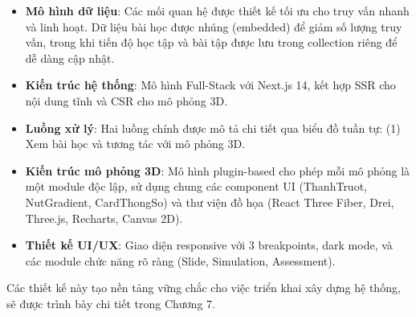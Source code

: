 \begin{itemize}
    \item \textbf{Mô hình dữ liệu}: Các mối quan hệ được thiết kế tối ưu cho truy vấn nhanh và linh hoạt. Dữ liệu bài học được nhúng (embedded) để giảm số lượng truy vấn, trong khi tiến độ học tập và bài tập được lưu trong collection riêng để dễ dàng cập nhật.
    
    \item \textbf{Kiến trúc hệ thống}: Mô hình Full-Stack với Next.js 14, kết hợp SSR cho nội dung tĩnh và CSR cho mô phỏng 3D.
    
    \item \textbf{Luồng xử lý}: Hai luồng chính được mô tả chi tiết qua biểu đồ tuần tự: (1) Xem bài học và tương tác với mô phỏng 3D.
    
    \item \textbf{Kiến trúc mô phỏng 3D}: Mô hình plugin-based cho phép mỗi mô phỏng là một module độc lập, sử dụng chung các component UI (ThanhTruot, NutGradient, CardThongSo) và thư viện đồ họa (React Three Fiber, Drei, Three.js, Recharts, Canvas 2D).
    
    \item \textbf{Thiết kế UI/UX}: Giao diện responsive với 3 breakpoints, dark mode, và các module chức năng rõ ràng (Slide, Simulation, Assessment).
\end{itemize}

Các thiết kế này tạo nền tảng vững chắc cho việc triển khai xây dựng hệ thống, sẽ được trình bày chi tiết trong Chương 7.